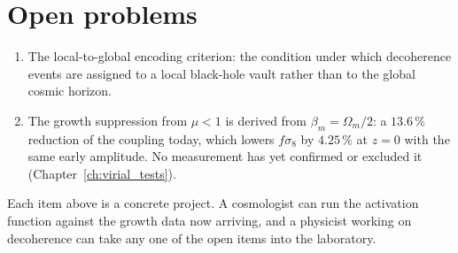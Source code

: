 \section{Open problems}\label{sec:vd_open}
\begin{enumerate}
\item The local-to-global encoding criterion: the condition under which decoherence events are assigned to a local black-hole vault rather than to the
global cosmic horizon. \openprob
\item The growth suppression from $\mu<1$ is derived from $\beta_m=\Omega_m/2$: a $13.6\,\%$ reduction of the coupling
today, which lowers $f\sigma_8$ by $4.25\,\%$ at $z=0$ with the same early amplitude. No measurement has yet confirmed or excluded it
(Chapter~\ref{ch:virial_tests}). \prediction
\end{enumerate}

Each item above is a concrete project. A cosmologist can run the activation function against the growth data now arriving, and a physicist working on decoherence can take any one of the open items into the laboratory.
